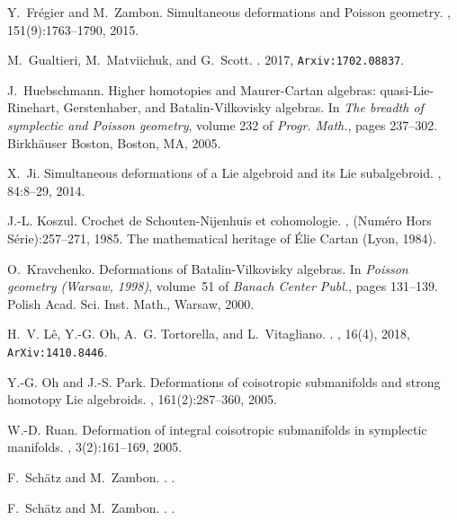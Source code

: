 \documentclass[11pt,thmsa]{amsart}
\theoremstyle{definition}
\begin{document}
Y.~Fr{{\'e}}gier and M.~Zambon.
\newblock Simultaneous deformations and {P}oisson geometry.
, 151(9):1763--1790, 2015.

M.~Gualtieri, M.~Matviichuk, and G.~Scott.
.
 2017, \texttt{Arxiv:1702.08837}.

J.~Huebschmann.
\newblock Higher homotopies and {M}aurer-{C}artan algebras:
  quasi-{L}ie-{R}inehart, {G}erstenhaber, and {B}atalin-{V}ilkovisky algebras.
\newblock In {\em The breadth of symplectic and {P}oisson geometry}, volume 232
  of {\em Progr. Math.}, pages 237--302. Birkh{\"a}user Boston, Boston, MA,
  2005.

X.~Ji.
\newblock Simultaneous deformations of a {L}ie algebroid and its {L}ie
  subalgebroid.
, 84:8--29, 2014.

J.-L. Koszul.
\newblock Crochet de {S}chouten-{N}ijenhuis et cohomologie.
, (Num{\'e}ro Hors S{\'e}rie):257--271, 1985.
\newblock The mathematical heritage of {\'E}lie Cartan (Lyon, 1984).

O.~Kravchenko.
\newblock Deformations of {B}atalin-{V}ilkovisky algebras.
\newblock In {\em Poisson geometry ({W}arsaw, 1998)}, volume~51 of {\em Banach
  Center Publ.}, pages 131--139. Polish Acad. Sci. Inst. Math., Warsaw, 2000.

H.~V. L{\^e}, Y.-G. Oh, A.~G. Tortorella, and L.~Vitagliano.
.
, 16(4), 2018, \texttt{ArXiv:1410.8446}.

Y.-G. Oh and J.-S. Park.
\newblock Deformations of coisotropic submanifolds and strong homotopy {L}ie
  algebroids.
, 161(2):287--360, 2005.

W.-D. Ruan.
\newblock Deformation of integral coisotropic submanifolds in symplectic
  manifolds.
, 3(2):161--169, 2005.

F.~Sch\"atz and M.~Zambon.
.
.

F.~Sch\"atz and M.~Zambon.
.
.
\end{document}

